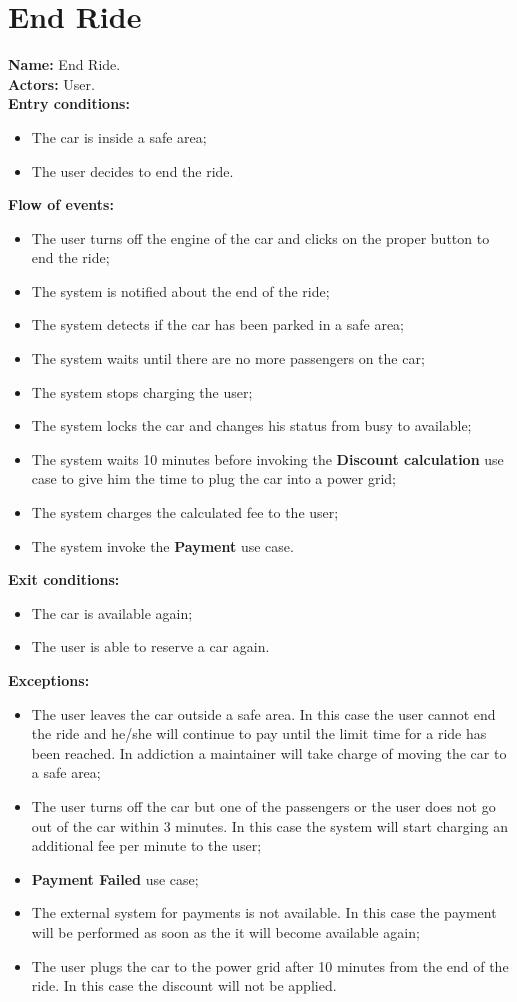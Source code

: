 \section*{End Ride}
\textbf{Name:} End Ride.\\
\textbf{Actors:} User.\\
\textbf{Entry conditions:}
\begin{itemize}
\item The car is inside a safe area;
\item The user decides to end the ride.
\end{itemize}
\textbf{Flow of events:}
\begin{itemize}
\item The user turns off the engine of the car and clicks on the proper button to end the ride;
\item The system is notified about the end of the ride;
\item The system detects if the car has been parked in a safe area;
\item The system waits until there are no more passengers on the car;
\item The system stops charging the user;
\item The system locks the car and changes his status from busy to available;
\item The system waits 10 minutes before invoking the \textbf{Discount calculation} use case to give him the time to plug the car into a power grid;
\item The system charges the calculated fee to the user;
\item The system invoke the \textbf{Payment} use case.
\end{itemize}
\textbf{Exit conditions:}
\begin{itemize}
\item The car is available again;
\item The user is able to reserve a car again.
\end{itemize}
\textbf{Exceptions:}
\begin{itemize}
\item The user leaves the car outside a safe area. In this case the user cannot end the ride and he/she will continue to pay until the limit time for a ride has been reached. In addiction a maintainer will take charge of moving the car to a safe area;
\item The user turns off the car but one of the passengers or the user does not go out of the car within 3 minutes. In this case the system will start charging an additional fee per minute to the user;
\item\textbf{Payment Failed} use case;
\item The external system for payments is not available. In this case the payment will be performed as soon as the it will become available again;
\item The user plugs the car to the power grid after 10 minutes from the end of the ride. In this case the discount will not be applied.
\end{itemize}

